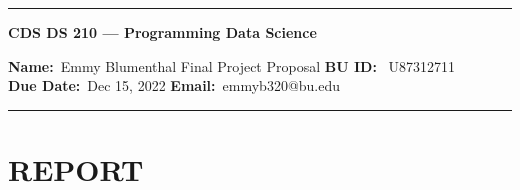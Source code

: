 \documentclass[10pt]{article}
\newcommand{\1}{\mathbf 1}
\begin{document}
\begin{center}
	\hrule
	\vspace{.4cm}
	{\textbf { \large CDS DS 210 --- Programming Data Science}}
\end{center}
{\textbf{Name:}\ Emmy Blumenthal \hspace{\fill} Final Project Proposal\hspace{\fill}  \textbf{BU ID:} \ U87312711 \\
\textbf{Due Date:}\  Dec 15, 2022   \hspace{\fill} \textbf{Email:}\ emmyb320@bu.edu \ 
\vspace{.4cm}
\hrule

\section*{REPORT}




}
\end{document}

